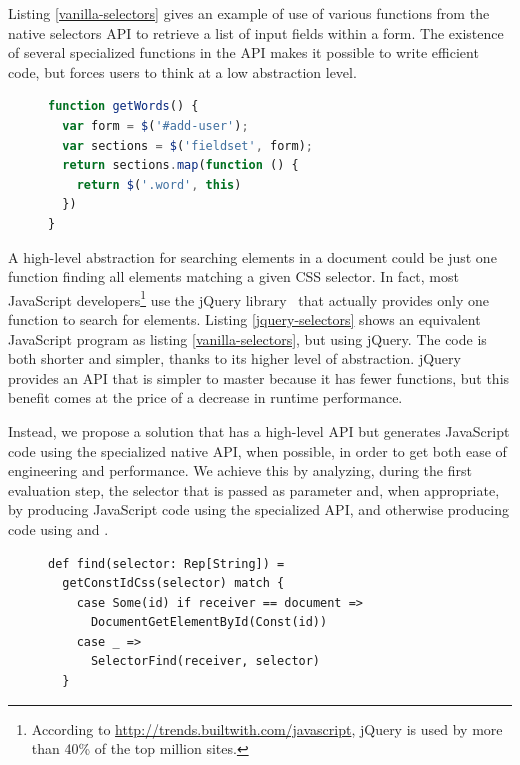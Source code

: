 \documentclass[preprint]{sigplanconf}
\begin{document}
Listing \ref{vanilla-selectors} gives an example of use of various functions from the native
selectors API to retrieve a list of input fields within a form. The existence of several
specialized functions in the API makes it possible to write efficient code, but forces users to
think at a low abstraction level.

\begin{figure}[htb]
\begin{lstlisting}[language=JavaScript,label=jquery-selectors,caption=Searching elements in jQuery]
function getWords() {
  var form = $('#add-user');
  var sections = $('fieldset', form);
  return sections.map(function () {
    return $('.word', this)
  })
}
\end{lstlisting}
\end{figure}

A high-level abstraction for searching elements in a document could be just one function
finding all elements matching a given CSS selector. In fact, most JavaScript
developers\footnote{According to
\href{http://trends.builtwith.com/javascript}{http://trends.builtwith.com/javascript}, jQuery is
used by more than 40\% of the top million sites.} use the jQuery library~\cite{Bibeault08_jQuery}
that actually provides only one function to search for elements. Listing \ref{jquery-selectors}
shows an equivalent JavaScript program as listing \ref{vanilla-selectors}, but using jQuery. The
code is both shorter and simpler, thanks to its higher level of abstraction. jQuery provides an API
that is simpler to master because it has fewer functions, but this benefit comes at the price of a
decrease in runtime performance.

Instead, we propose a solution that has a high-level API but generates JavaScript code using the
specialized native API, when possible, in order to get both ease of engineering and performance.
We achieve this by analyzing, during the first evaluation step, the selector that is
passed as parameter and, when appropriate, by producing JavaScript code using the specialized API,
and otherwise producing code using  and .

\begin{figure}[htb]
\begin{lstlisting}[label=selector-impl,caption=Selectors optimization]
def find(selector: Rep[String]) =
  getConstIdCss(selector) match {
    case Some(id) if receiver == document =>
      DocumentGetElementById(Const(id))
    case _ =>
      SelectorFind(receiver, selector)
  }
\end{lstlisting}
\end{figure}
\end{document}
